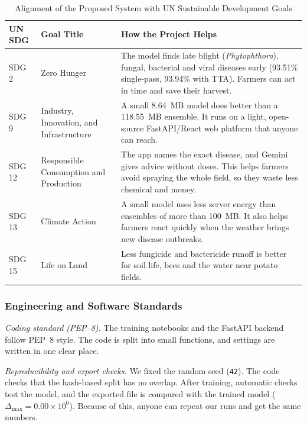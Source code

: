 \begin{table}[htbp]
\caption{Alignment of the Proposed System with UN Sustainable Development Goals}
\label{tab:sdg_alignment}
\begin{center}
\begin{tabularx}{\textwidth}{| L{2.3cm} | L{3.6cm} | X |}
\hline
\textbf{UN SDG} & \textbf{Goal Title} & \textbf{How the Project Helps} \\
\hline
SDG 2 & Zero Hunger & The model finds late blight (\textit{Phytophthora}), fungal, bacterial and viral diseases early (93.51\% single-pass, 93.94\% with TTA). Farmers can act in time and save their harvest. \\
\hline
SDG 9 & Industry, Innovation, and Infrastructure & A small 8.64~MB model does better than a 118.55~MB ensemble. It runs on a light, open-source FastAPI/React web platform that anyone can reach. \\
\hline
SDG 12 & Responsible Consumption and Production & The app names the exact disease, and Gemini gives advice without doses. This helps farmers avoid spraying the whole field, so they waste less chemical and money. \\
\hline
SDG 13 & Climate Action & A small model uses less server energy than ensembles of more than 100~MB. It also helps farmers react quickly when the weather brings new disease outbreaks. \\
\hline
SDG 15 & Life on Land & Less fungicide and bactericide runoff is better for soil life, bees and the water near potato fields. \\
\hline
\end{tabularx}
\end{center}
\end{table}

\subsubsection*{Engineering and Software Standards}
\textit{Coding standard (PEP~8).} The training notebooks and the FastAPI backend follow PEP~8 style. The code is split into small functions, and settings are written in one clear place.

\textit{Reproducibility and export checks.} We fixed the random seed (\texttt{42}). The code checks that the hash-based split has no overlap. After training, automatic checks test the model, and the exported file is compared with the trained model ($\Delta_{\max} = 0.00 \times 10^{0}$). Because of this, anyone can repeat our runs and get the same numbers.

